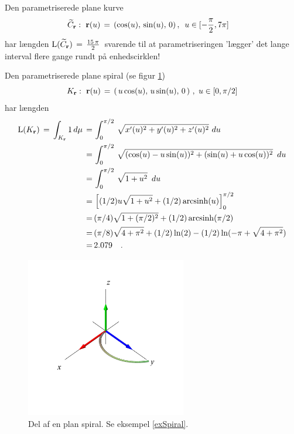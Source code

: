 \begin{example}\label{exKurveLang}
Den parametriserede plane kurve $$\widetilde{C}_{\bf
r}: \,\, {\bf r}(u) \, = \, \left(\cos(u),
\,\sin(u),\, 0\right), \, \, \, u \in
[-\frac{\pi}{2}, 7\pi] \quad $$ har længden
$\operatorname{L}(\widetilde{C}_{\bf r}) \, = \,
\frac{15\,\pi}{2} \, $ svarende til at
parametriseringen 'lægger' det lange interval
flere gange rundt på enhedscirklen!
\end{example}


\begin{example} \label{exSpiral}
Den parametriserede plane spiral (se figur \ref{figSpiral})
$$
K_{\bf r}: \,\, {\bf
r}(u) \, = \, \left(\, u\cos(u), \,u\sin(u), \, 0 \, \right) \, , \, \, u \in
[0, \pi/2]
$$
har længden
\begin{equation}
\begin{aligned}
\operatorname{L}(K_{\bf r}) \, = \, \int_{K_{\bf r}} 1 \, d\mu \, = \,
&\int_{0}^{\pi/2} \,\sqrt{x'(u)^{2} + y'(u)^{2} + z'(u)^{2}}\,\,du \\
\, = \, &\int_{0}^{\pi/2}\,\sqrt{(\cos(u) - u\sin(u))^{2} + (\sin(u) + u\cos(u))^{2}}\,\,\,du \\
\, = \, &\int_{0}^{\pi/2}\,\sqrt{1+u^{2}}\,\,\,du \\
  \, = \, & \left[(1/2)u\sqrt{1+u^2}+(1/2)\operatorname{arcsinh}(u)\right]_{0}^{\pi/2} \\
   \, = \, &  (\pi/4)\sqrt{1+(\pi/2)^2}+(1/2)\operatorname{arcsinh}(\pi/2) \\
    \, = \, &  (\pi/8)\sqrt{4+\pi^{2}}+(1/2)\ln(2)-(1/2)\ln(-\pi+\sqrt{4+\pi^{2}}) \\
    \, = \, &   2.079  \quad .
\end{aligned}
\end{equation}
\end{example}



\begin{figure}[ht]
\centerline{\includegraphics[height=70mm]{FIGS/plotSpiral}}
\begin{center}
\caption{\small{Del af en plan spiral. Se
eksempel \ref{exSpiral}. }} \label{figSpiral}
\end{center}
\end{figure}



